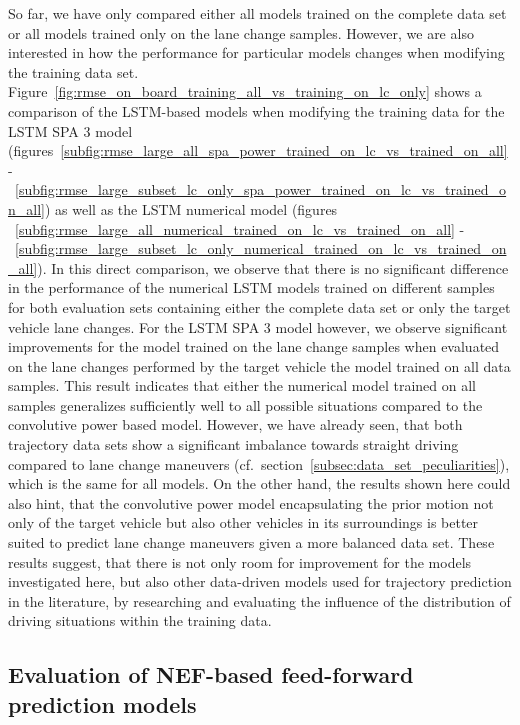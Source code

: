 So far, we have only compared either all models trained on the complete data set or all models trained only on the lane change samples.
However, we are also interested in how the performance for particular models changes when modifying the training data set.
Figure~\ref{fig:rmse_on_board_training_all_vs_training_on_lc_only} shows a comparison of the \ac{LSTM}-based models when modifying the training data for the \ac{LSTM} \acs{SPA} \num{3} model (figures~\ref{subfig:rmse_large_all_spa_power_trained_on_lc_vs_trained_on_all} -~\ref{subfig:rmse_large_subset_lc_only_spa_power_trained_on_lc_vs_trained_on_all}) as well as the \acs{LSTM} numerical model (figures
~\ref{subfig:rmse_large_all_numerical_trained_on_lc_vs_trained_on_all} -~\ref{subfig:rmse_large_subset_lc_only_numerical_trained_on_lc_vs_trained_on_all}).
In this direct comparison, we observe that there is no significant difference in the performance of the numerical \ac{LSTM} models trained on different samples for both evaluation sets containing either the complete data set or only the target vehicle lane changes.
For the \ac{LSTM} \acs{SPA} \num{3} model however, we observe significant improvements for the model trained on the lane change samples when evaluated on the lane changes performed by the target vehicle the model trained on all data samples.
This result indicates that either the numerical model trained on all samples generalizes sufficiently well to all possible situations compared to the convolutive power based model.
However, we have already seen, that both trajectory data sets show a significant imbalance towards straight driving compared to lane change maneuvers (cf.\ section~\ref{subsec:data_set_peculiarities}), which is the same for all models.
On the other hand, the results shown here could also hint, that the convolutive power model encapsulating the prior motion not only of the target vehicle but also other vehicles in its surroundings is better suited to predict lane change maneuvers given a more balanced data set.
These results suggest, that there is not only room for improvement for the models investigated here, but also other data-driven models used for trajectory prediction in the literature, by researching and evaluating the influence of the distribution of driving situations within the training data.

\subsection{Evaluation of \acs{NEF}-based feed-forward prediction models}%
\label{subsec:evaluation_of_nef_based_feed_forward_prediction_models}

